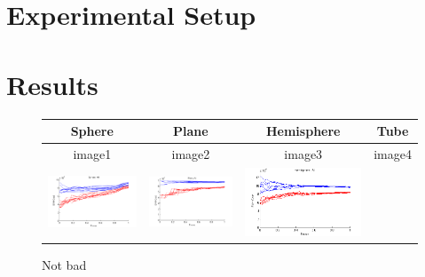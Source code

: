 \documentclass[twocolumn]{article}
\begin{document}
\section{Experimental Setup}

\section{Results}
\begin{figure}
\caption{Not bad}
\begin{tabular}{|c|c|c|c|}
\hline
Sphere & Plane & Hemisphere & Tube \\
\hline
image1 & image2 & image3 & image4 \\
\hline 
\includegraphics[scale=.3]{sphere_all.png}
&\includegraphics[scale=.3]{plane_all.png}
&\includegraphics[scale=.3]{hemisphere_all.png}

\end{tabular}
\end{figure}
\end{document}
